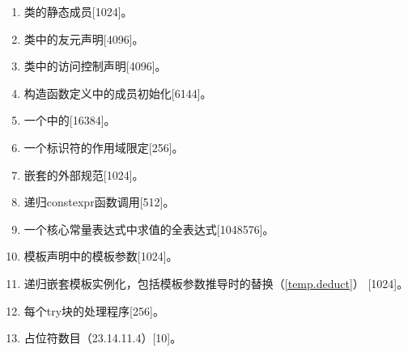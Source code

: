 \begin{enumerate}
  \item{类的静态成员[1024]。}
  \item{类中的友元声明[4096]。}
  \item{类中的访问控制声明[4096]。}
  \item{构造函数定义中的成员初始化[6144]。}
  \item{一个中的[16384]。}
  \item{一个标识符的作用域限定[256]。}
  \item{嵌套的外部规范[1024]。}
  \item{递归constexpr函数调用[512]。}
  \item{一个核心常量表达式中求值的全表达式[1048576]。}
  \item{模板声明中的模板参数[1024]。}
  \item{递归嵌套模板实例化，包括模板参数推导时的替换（\ref{temp.deduct}）
    [1024]。}
  \item{每个try块的处理程序[256]。}
  \item{占位符数目（23.14.11.4）[10]。}
\end{enumerate}
